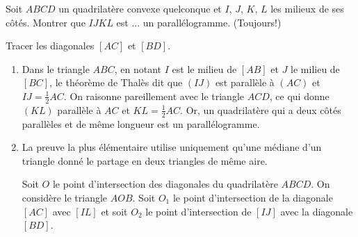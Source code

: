 \begin{exo} \label{Varignon}
Soit $ABCD$ un quadrilatère convexe quelconque et $I$, $J$, $K$, $L$ les milieux de ses côtés.
Montrer que $IJKL$ est ... un parallélogramme. (Toujours!)
\begin{center}
\end{center}
\begin{hint} 
Tracer les diagonales $[AC]$ et $[BD]$. %
\end{hint}
\begin{sol}
\begin{enumerate}
\item 
Dans le triangle $ABC$, en notant $I$ est le milieu de $[AB]$ et $J$ le milieu de $[BC]$, le théorème de Thalès dit que $(IJ)$ est parall\`ele \`a $(AC)$ et $IJ = \frac{1}{2} AC$. On raisonne pareillement avec le triangle $ACD$, ce qui donne $(KL)$ parall\`ele \`a $AC$ et $KL = \frac{1}{2} AC$. Or, un quadrilat\`ere qui a deux c\^ot\'es parall\`eles et de m\^eme longueur est un parall\'elogramme.

\item La preuve la plus élémentaire utilise uniquement qu'une médiane d'un triangle donné le partage en deux triangles de même aire.

Soit $O$ le point d'intersection des diagonales du quadrilat\`ere $ABCD$. On consid\`ere le triangle $AOB$. Soit $O_1$ le point d'intersection de la diagonale $[AC]$ avec $[IL]$ et soit $O_2$ le point d'intersection de $[IJ]$ avec la diagonale $[BD]$.

 

\end{enumerate}
\end{sol}
\end{exo}
